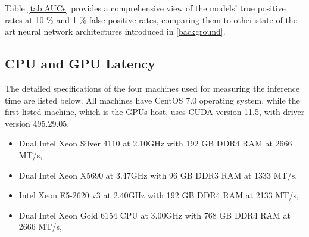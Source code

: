 Table \ref{tab:AUCs} provides a comprehensive view of the models' true positive rates at 10 \% and 1 \% false positive rates, comparing them to other state-of-the-art neural network architectures introduced in \cref{background}.

\subsection{CPU and GPU Latency}

\indo{|}
\indo{|}

The detailed specifications of the four machines used for measuring the inference time are listed below. All machines have CentOS 7.0 operating system, while the first listed machine, which is the GPUs host, uses CUDA version 11.5, with driver version 495.29.05.

\begin{itemize}
  \item Dual Intel Xeon Silver 4110 at 2.10GHz with 192 GB DDR4 RAM at 2666 MT/s,
  \item Dual Intel Xeon X5690 at 3.47GHz with 96 GB DDR3 RAM at 1333 MT/s,
  \item Intel Xeon E5-2620 v3 at 2.40GHz with 192 GB DDR4 RAM at 2133 MT/s,
  \item Dual Intel Xeon Gold 6154 CPU at 3.00GHz with 768 GB DDR4 RAM at 2666 MT/s,
\end{itemize}


